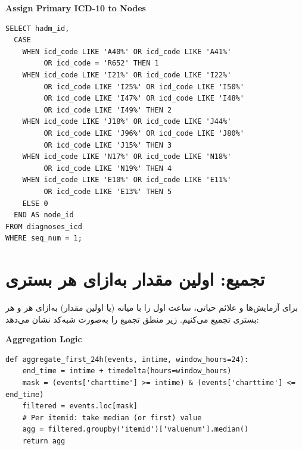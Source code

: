 \begin{latin}\smallskip\noindent\textbf{Assign Primary ICD-10 to Nodes}\par\smallskip
\begin{Verbatim}[fontsize=\footnotesize,frame=single]
SELECT hadm_id,
  CASE 
    WHEN icd_code LIKE 'A40%' OR icd_code LIKE 'A41%' 
         OR icd_code = 'R652' THEN 1
    WHEN icd_code LIKE 'I21%' OR icd_code LIKE 'I22%' 
         OR icd_code LIKE 'I25%' OR icd_code LIKE 'I50%' 
         OR icd_code LIKE 'I47%' OR icd_code LIKE 'I48%' 
         OR icd_code LIKE 'I49%' THEN 2
    WHEN icd_code LIKE 'J18%' OR icd_code LIKE 'J44%' 
         OR icd_code LIKE 'J96%' OR icd_code LIKE 'J80%' 
         OR icd_code LIKE 'J15%' THEN 3
    WHEN icd_code LIKE 'N17%' OR icd_code LIKE 'N18%' 
         OR icd_code LIKE 'N19%' THEN 4
    WHEN icd_code LIKE 'E10%' OR icd_code LIKE 'E11%' 
         OR icd_code LIKE 'E13%' THEN 5
    ELSE 0
  END AS node_id
FROM diagnoses_icd
WHERE seq_num = 1;
\end{Verbatim}
\end{latin}

\section{تجمیع: اولین مقدار به‌ازای هر بستری}

برای آزمایش‌ها و علائم حیاتی،  ساعت اول را با میانه (یا اولین مقدار) به‌ازای هر  و هر بستری تجمیع می‌کنیم. زیر منطق تجمیع را به‌صورت شبه‌کد نشان می‌دهد:

\begin{latin}\smallskip\noindent\textbf{Aggregation Logic}\par\smallskip
\begin{Verbatim}[fontsize=\footnotesize,frame=single]
def aggregate_first_24h(events, intime, window_hours=24):
    end_time = intime + timedelta(hours=window_hours)
    mask = (events['charttime'] >= intime) & (events['charttime'] <= end_time)
    filtered = events.loc[mask]
    # Per itemid: take median (or first) value
    agg = filtered.groupby('itemid')['valuenum'].median()
    return agg
\end{Verbatim}
\end{latin}
